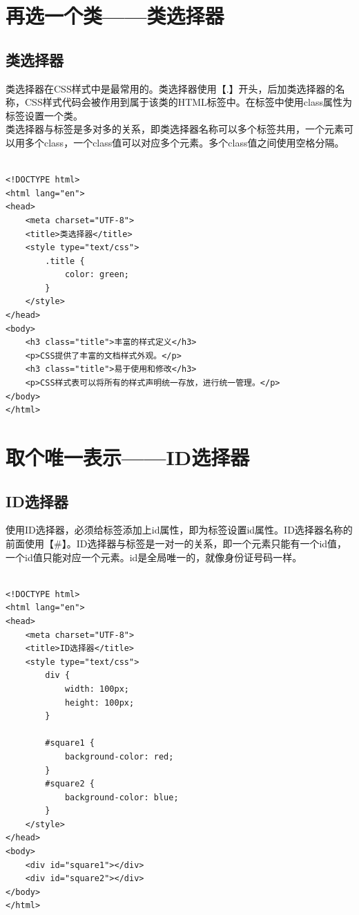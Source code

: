\newpage

\section{再选一个类——类选择器}

\subsection{类选择器}

类选择器在CSS样式中是最常用的。类选择器使用【.】开头，后加类选择器的名称，CSS样式代码会被作用到属于该类的HTML标签中。在标签中使用class属性为标签设置一个类。\\

类选择器与标签是多对多的关系，即类选择器名称可以多个标签共用，一个元素可以用多个class，一个class值可以对应多个元素。多个class值之间使用空格分隔。\\

\\

\begin{lstlisting}[style=htmlcssjs]
<!DOCTYPE html>
<html lang="en">
<head>
    <meta charset="UTF-8">
    <title>类选择器</title>
    <style type="text/css">
        .title {
            color: green;
        }
    </style>
</head>
<body>
    <h3 class="title">丰富的样式定义</h3>
    <p>CSS提供了丰富的文档样式外观。</p>
    <h3 class="title">易于使用和修改</h3>
    <p>CSS样式表可以将所有的样式声明统一存放，进行统一管理。</p>
</body>
</html>
\end{lstlisting}

\newpage

\section{取个唯一表示——ID选择器}

\subsection{ID选择器}

使用ID选择器，必须给标签添加上id属性，即为标签设置id属性。ID选择器名称的前面使用【\#】。ID选择器与标签是一对一的关系，即一个元素只能有一个id值，一个id值只能对应一个元素。id是全局唯一的，就像身份证号码一样。\\

\\

\begin{lstlisting}[style=htmlcssjs]
<!DOCTYPE html>
<html lang="en">
<head>
    <meta charset="UTF-8">
    <title>ID选择器</title>
    <style type="text/css">
        div {
            width: 100px;
            height: 100px;
        }

        #square1 {
            background-color: red;
        }
        #square2 {
            background-color: blue;
        }
    </style>
</head>
<body>
    <div id="square1"></div>
    <div id="square2"></div>
</body>
</html>
\end{lstlisting}


